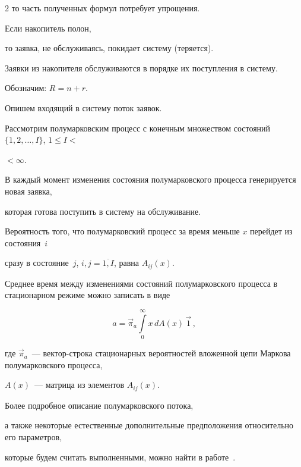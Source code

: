 \begin{multicols}{2}
то часть полученных формул потребует упрощения.


Если накопитель полон,


то заявка, не обслуживаясь, покидает систему (теряется).


Заявки из накопителя обслуживаются в порядке их поступления в систему.


Обозначим: $R=n+r$.





Опишем входящий в систему поток заявок.





Рассмотрим полумарковским процесс с конечным множеством состояний $\{1,2,\ldots,I\}$, $1\le I<$\linebreak


$<\infty$.


В каждый момент изменения состояния полумарковского процесса генерируется новая заявка,


которая готова поступить в систему на обслуживание.


Вероятность того, что полумарковский процесс за время меньше $x$ перейдет из состояния~$i$


сразу в состояние~$j$, $i,j=\overline{1,I}$, равна $A_{ij}(x)$.


Среднее время между изменениями состояний полумарковского процесса в стационарном режиме можно записать в виде


%




\begin{equation}


a = \vec\pi_a \int\limits_0^\infty x\, dA(x)\, \vec1\,,


\label{a}


\end{equation}


где $\vec\pi_a$~--- вектор-строка стационарных вероятностей вложенной цепи Маркова полумарковского процесса,


$A(x)$~--- матрица из элементов $A_{ij}(x)$.





Более подробное описание полумарковского потока,


а также некоторые естественные дополнительные предположения относительно его параметров,


которые будем считать выполненными, можно найти в работе~\cite{PCh04}.






\end{multicols}
